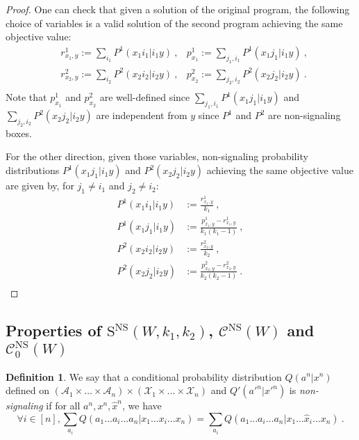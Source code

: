 \documentclass[11pt]{article}
\theoremstyle{definition}
\newtheorem{defi}[theo]{Definition}
\theoremstyle{remark}
\begin{document}
\begin{proof}
  One can check that given a solution of the original program, the following choice of variables is a valid solution of the second program achieving the same objective value:
\begin{equation}
  \begin{aligned}
    &r^1_{x_1,y} := \sum_{i_1} P^1(x_1i_1|i_1y) \ , &p^1_{x_1} := \sum_{j_1,i_1} P^1(x_1j_1|i_1y) \ ,\\
    &r^2_{x_2,y} := \sum_{i_2} P^2(x_2i_2|i_2y) \ , &p^2_{x_2} := \sum_{j_2,i_2} P^2(x_2j_2|i_2y) \ .\\
  \end{aligned}
\end{equation}
Note that $p^1_{x_1}$ and $p^2_{x_2}$ are well-defined since  $\sum_{j_1,i_1} P^1(x_1j_1|i_1y)$ and $\sum_{j_2,i_2} P^2(x_2j_2|i_2y)$ are independent from $y$ since $P^1$ and $P^2$ are non-signaling boxes.

For the other direction, given those variables, non-signaling probability distributions $P^1(x_1j_1|i_1y)$ and $P^2(x_2j_2|i_2y)$ achieving the same objective value are given by, for $j_1 \not=i_1$ and $j_2 \not= i_2$:
\begin{equation}
  \begin{aligned}
    P^1(x_1i_1|i_1y) &:= \frac{r^1_{x_1,y}}{k_1} \ ,\\
    P^1(x_1j_1|i_1y) &:= \frac{p^1_{x_1,y} - r^1_{x_1,y}}{k_1(k_1-1)} \ ,\\
    P^2(x_2i_2|i_2y) &:= \frac{r^2_{x_2,y}}{k_2} \ ,\\
    P^2(x_2j_2|i_2y) &:= \frac{p^2_{x_2,y} - r^2_{x_2,y}}{k_2(k_2-1)} \ .\\
  \end{aligned}
\end{equation}
\end{proof}

\subsection{Properties of $\mathrm{S}^{\mathrm{NS}}(W,k_1,k_2)$, $\mathcal{C}^{\mathrm{NS}}(W)$ and $\mathcal{C}^{\mathrm{NS}}_0(W)$}
\begin{defi}
  We say that a conditional probability distribution $Q(a^n|x^n)$ defined on $\left(\mathcal{A}_1 \times \ldots \times \mathcal{A}_n\right) \times \left(\mathcal{X}_1 \times \ldots \times \mathcal{X}_n\right)$ and $Q'(a'^n|x'^n)$ is \emph{non-signaling} if for all $a^n, x^n, \hat{x}^n$, we have
    \[ \forall i \in [n], \sum_{a_i}Q(a_1\ldots a_i \ldots a_n|x_1\ldots x_i \ldots x_n) = \sum_{a_i}Q(a_1\ldots a_i \ldots a_n|x_1\ldots \hat{x}_i \ldots x_n) \ .\]
\end{defi}
\end{document}
